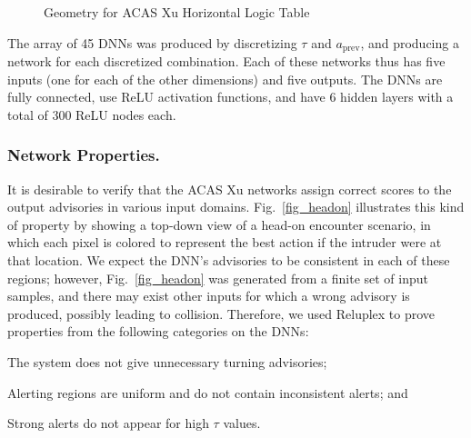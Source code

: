 \documentclass[a4paper]{llncs}
\begin{document}
\begin{figure}[htp]
  	\centering
	\caption{Geometry for ACAS Xu Horizontal Logic Table}
	\label{geo_horizontal}
\end{figure}


The array of 45 DNNs was produced by discretizing $\tau$ and
$a_\text{prev}$, and producing a network for each discretized combination.
Each of these networks thus has five inputs (one for each of the other
dimensions) and five outputs. The DNNs are fully connected, use ReLU activation
functions, and have 6 hidden layers with
a total of 300 ReLU nodes each.



\subsubsection{Network Properties.}
It is desirable to verify that the ACAS Xu networks assign correct scores to
the output advisories in various input domains. 
Fig.~\ref{fig_headon} illustrates this kind of property by showing a
top-down view of a head-on encounter scenario, in which each pixel is colored to represent the best action
if the intruder were at that location. 
We expect the DNN's advisories to be consistent in each of these
regions; however, Fig.~\ref{fig_headon} was generated from a finite
set of input samples, and there may exist other inputs for which a wrong
advisory is produced, possibly leading to collision. Therefore, we
used Reluplex to prove properties from the following categories on the
DNNs:
\begin{inparaenum}[(i)]
	\item The system does not give unnecessary turning advisories;
	\item Alerting regions are uniform and do not contain
          inconsistent alerts; and
	\item Strong alerts do not appear for high $\tau$ values.
\end{inparaenum}
\end{document}
